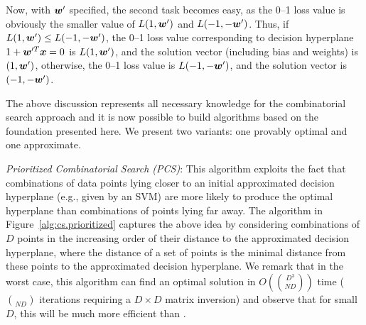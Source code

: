 Now, with $\boldsymbol{w}'$ specified, the second task becomes easy, as the 0--1
loss value is obviously the smaller value of $L(1,\boldsymbol{w}')$ and $L(-1,
-\boldsymbol{w}')$. Thus, if $L(1,\boldsymbol{w}') \leq L(-1,-\boldsymbol{w}')$, the 0--1 loss value
corresponding to decision hyperplane $1+\boldsymbol{w}'^T\boldsymbol{x} = 0$ is
$L(1,\boldsymbol{w}')$, and the solution vector (including bias and weights) is
$(1, \boldsymbol{w}')$, otherwise, the 0--1 loss value is $L(-1,-\boldsymbol{w}')$, and the
solution vector is $(-1,-\boldsymbol{w}')$.

The above discussion represents all necessary knowledge for the
combinatorial search approach and it is now possible to build
algorithms based on the foundation presented here.  We present
two variants: one provably optimal and one approximate.

\noindent\emph{Prioritized Combinatorial Search (PCS)}: This algorithm
exploits the fact that combinations of data points lying closer to an
initial approximated decision hyperplane (e.g., given by an SVM) are
more likely to produce the optimal hyperplane than combinations of
points lying far away.  The algorithm in
Figure~\ref{alg:cs.prioritized} captures the above idea by considering
combinations of $D$ points in the increasing order of their distance
to the approximated decision hyperplane, where the distance of a set
of points is the minimal distance from these points to the
approximated decision hyperplane. We remark that in the worst case,
this algorithm can find an optimal solution in $O(D^3 \choose{N}{D})$ 
time ($\choose{N}{D}$ iterations requiring a $D \times D$ matrix inversion)
and observe that for small $D$, this will be much more efficient than \BB.

